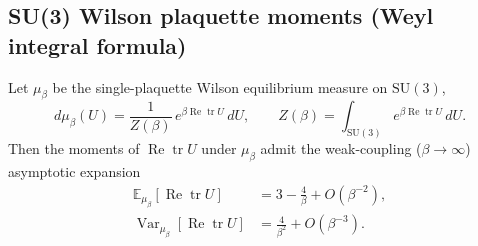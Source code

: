 \subsection{SU(3) Wilson plaquette moments (Weyl integral formula)}

\begin{lemma}
%
\label{lem:weyl_moments}
Let $\mu_{\beta}$ be the single-plaquette Wilson equilibrium measure
on $\mathrm{SU}(3)$,
\[
  d\mu_{\beta}(U) = \frac{1}{Z(\beta)}\, e^{\beta \operatorname{Re}\operatorname{tr}U}\, dU,
  \qquad
  Z(\beta) = \int_{\mathrm{SU}(3)} e^{\beta \operatorname{Re}\operatorname{tr}U}\, dU.
\]
Then the moments of $\operatorname{Re}\operatorname{tr}U$ under
$\mu_{\beta}$ admit the weak-coupling ($\beta \to \infty$) asymptotic
expansion
\begin{align}
  \label{eq:weyl_E1}
  \mathbb{E}_{\mu_{\beta}}[\operatorname{Re}\operatorname{tr}U]
  &= 3 - \frac{4}{\beta} + O(\beta^{-2}),\\
  \label{eq:weyl_Var}
  \operatorname{Var}_{\mu_{\beta}}[\operatorname{Re}\operatorname{tr}U]
  &= \frac{4}{\beta^{2}} + O(\beta^{-3}).
\end{align}
\end{lemma}


